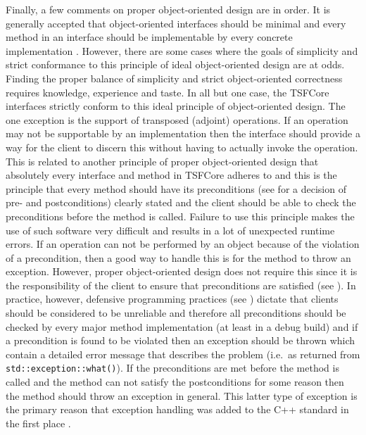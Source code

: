 Finally, a few comments on proper object-oriented design are in order.
It is generally accepted that object-oriented interfaces should be
minimal and every method in an interface should be implementable by
every concrete implementation \cite[Section
24.4.3]{ref:stroustrup_1997}.  However, there are some cases where the
goals of simplicity and strict conformance to this principle of ideal
object-oriented design are at odds.  Finding the proper balance of
simplicity and strict object-oriented correctness requires knowledge,
experience and taste.  In all but one case, the TSFCore interfaces
strictly conform to this ideal principle of object-oriented design.
The one exception is the support of transposed (adjoint) operations.
If an operation may not be supportable by an implementation then the
interface should provide a way for the client to discern this without
having to actually invoke the operation.  This is related to another
principle of proper object-oriented design that absolutely every
interface and method in TSFCore adheres to and this is the principle
that every method should have its preconditions (see
\cite{ref:uml_distilled_2nd_ed} for a decision of pre- and
postconditions) clearly stated and the client should be able to check
the preconditions before the method is called.  Failure to use this
principle makes the use of such software very difficult and results in
a lot of unexpected runtime errors.  If an operation can not be
performed by an object because of the violation of a precondition,
then a good way to handle this is for the method to throw an
exception.  However, proper object-oriented design does not require
this since it is the responsibility of the client to ensure that
preconditions are satisfied (see
\cite{ref:uml_distilled_2nd_ed}).  In practice, however, defensive
programming practices (see \cite{ref:stroustrup_1997}) dictate that
clients should be considered to be unreliable and therefore all
preconditions should be checked by every major method implementation
(at least in a debug build) and if a precondition is found to be
violated then an exception should be thrown which contain a detailed
error message that describes the problem (i.e.~as returned from
\texttt{std::exception::what()}).  If the preconditions are met before
the method is called and the method can not satisfy the postconditions
for some reason then the method should throw an exception in general.
This latter type of exception is the primary reason that exception
handling was added to the C++ standard in the first place
\cite{ref:design_evol_cpp}.

